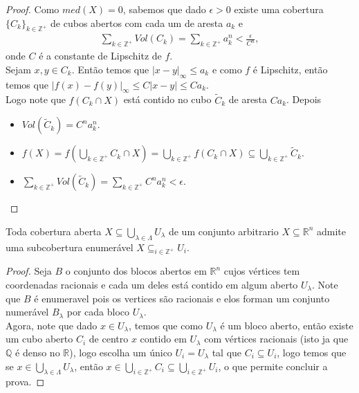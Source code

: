 \begin{proof} 
  Como $med(X)=0$, sabemos que dado $\epsilon>0$ existe uma cobertura $\{C_k\}_{k\in\mathbb{Z}^{+}}$ de cubos abertos com cada um de aresta $a_k$ e
  \begin{align*}
    \sum_{k\in\mathbb{Z}^{+}}Vol(C_k)=\sum_{k\in\mathbb{Z}^{+}}a_{k}^{n}<\frac{\epsilon}{C^{n}},
  \end{align*}
  onde $C$ é a constante de Lipschitz de $f$.\\ 
  Sejam $x,y\in C_k$. Então temos que $|x-y|_{\infty}\leq a_k$ e como $f$ é Lipschitz, então temos que $|f(x)-f(y)|_{\infty}\leq C|x-y|\leq Ca_k$.\\
  Logo note que $f(C_k\cap X)$ está contido no cubo $\tilde{C}_k$ de aresta $Ca_k$. Depois
  \begin{itemize}
    \item $Vol(\tilde{C}_k)=C^{n}a_{k}^{n}$.\\
    \item $f(X)=f\left( \bigcup_{k\in\mathbb{Z}^{+}}C_k\cap X \right)=\bigcup_{k\in\mathbb{Z}^{+}}f(C_k\cap X)\subseteq \bigcup_{k\in\mathbb{Z}^{+}}\tilde{C}_{k}$.
    \item $\sum_{k\in\mathbb{Z}^{+}}Vol(\tilde{C}_{k})=\sum_{k\in\mathbb{Z}^{+}}C^{n}a_{k}^{n}<\epsilon.$
  \end{itemize}
\end{proof}
\begin{theorem}
  Toda cobertura aberta $X\subseteq\bigcup_{\lambda\in\Lambda}U_{\lambda}$ de um conjunto arbitrario $X\subseteq \mathbb{R}^{n}$ admite uma subcobertura enumerável $X\subseteq_{i\in\mathbb{Z}^{+}}U_{i}$. 
\end{theorem}
\begin{proof} 
  Seja $B$ o conjunto dos blocos abertos em $\mathbb{R}^{n}$ cujos vértices tem coordenadas racionais e cada um deles está contido em algum aberto $U_{\lambda}$. Note que $B$ é enumeravel pois os vertices são racionais e elos forman um conjunto numerável $B_{\lambda}$ por cada bloco $U_{\lambda}$.\\
  Agora, note que dado $x\in U_{\lambda}$, temos que como $U_{\lambda}$ é um bloco aberto, então existe um cubo aberto $C_i$ de centro $x$ contido em $U_{\lambda}$ com vértices racionais (isto ja que $\mathbb{Q}$ é denso no $\mathbb{R}$), logo escolha um único $U_{i}=U_{\lambda}$ tal que $C_i\subseteq U_i$, logo temos que se $x\in\bigcup_{\lambda\in\Lambda}U_{\lambda}$, então $x\in\bigcup_{i\in\mathbb{Z}^{+}}C_i\subseteq \bigcup_{i\in\mathbb{Z}^{+}} U_i$, o que permite concluir a prova.
\end{proof}
